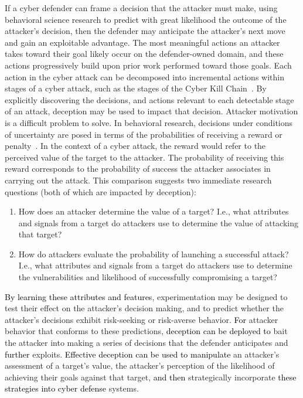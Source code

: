 \documentclass{article}
\newcommand\mmm[1]{\textcolor{black}{#1}}
\newcommand\nnn[1]{\textcolor{black}{#1}}
\begin{document}
If a cyber defender can frame a decision that the attacker must make, using behavioral science research to predict with great likelihood the outcome of the attacker's decision, then the defender may anticipate the attacker's next move and gain an exploitable advantage. 
The most meaningful actions an attacker takes toward their goal likely occur on the defender-owned domain, and these actions progressively build upon prior work performed toward those goals. Each action in the cyber attack can be decomposed into incremental actions within stages of a cyber attack, such as the stages of the Cyber Kill Chain~\cite{lockheed}. By explicitly discovering the decisions, and actions relevant to each detectable stage of an attack, deception may be used to impact that decision. 
Attacker motivation is a difficult problem to solve. In behavioral research, decisions under conditions of uncertainty are posed in terms of the probabilities of receiving a reward or penalty~\cite{kahneman1979}. 
In the context of a cyber attack, the reward would refer to the perceived value of the target to the attacker. The probability of receiving this reward corresponds to the probability of success the attacker associates in carrying out the attack. This comparison suggests two immediate research questions (both of which are impacted by deception): 
\begin{enumerate}
	\item How does an attacker determine the value of a target? I.e., what attributes and signals from a target do attackers use to determine the value of attacking that target?
	\item How do attackers evaluate the probability of launching a successful attack? I.e., what attributes and signals from a target do attackers use to determine the vulnerabilities and likelihood of successfully compromising a target? 
\end{enumerate}

\nnn{By learning these attributes and features}, experimentation may be designed to test their effect on the attacker's decision making, and to predict whether the attacker's decisions exhibit risk-seeking or risk-averse behavior. \nnn{For} attacker behavior that conforms to these predictions, \nnn{deception can be deployed to} bait the attacker into making a series of decisions that the defender anticipates and \mmm{further} exploits. 
\nnn{Effective deception can be used to manipulate} an attacker's assessment of a target's value, the attacker's perception of the likelihood of achieving their goals against that target, \nnn{and then} strategically incorporate \nnn{these strategies into cyber defense} systems. 
\end{document}
